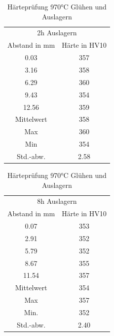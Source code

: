 \documentclass[a4paper, 11pt]{tubsreprt}
\begin{document}
\begin{table}[t] 	%
\begin{tabular}{c | c}
\multicolumn{2}{c}{2h Auslagern} \\
\cline{1-2}
Abstand in mm & Härte in HV10 \\
0.03 & 357 \\
3.16 & 358 \\
6.29 & 360 \\
9.43 & 354 \\
12.56 & 359 \\
\hline
Mittelwert & 358 \\
Max & 360 \\
Min & 354 \\
Std.-abw. & 2.58 \\
\end{tabular}
\begin{tabular}{c | c}
\multicolumn{2}{c}{8h Auslagern} \\
\cline{1-2}
Abstand in mm & Härte in HV10 \\
0.07	&		353 \\
2.91	&		352 \\
5.79	&		352\\
8.67	& 		355\\
11.54	& 		357\\
\hline
Mittelwert &	354\\
Max	& 			357\\
Min. &			352	\\	
Std.-abw.	&	2.40\\

\end{tabular}
\caption{Härteprüfung 970°C Glühen und Auslagern}
\label{heartepruefung970 inkl auslagern}
\end{table}
\end{document}
